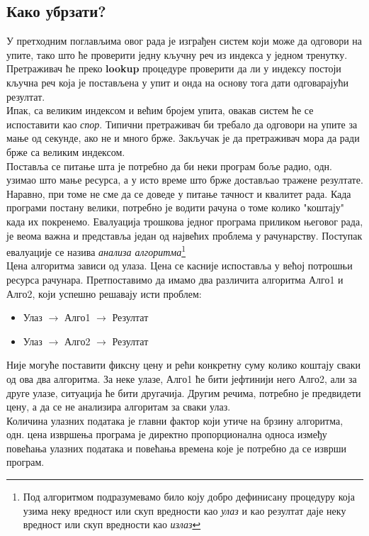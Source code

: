	\subsection{Како убрзати?}
	У претходним поглављима овог рада је изграђен систем који може да одговори на упите, тако што ће проверити једну кључну реч из индекса у једном тренутку. Претраживач ће преко \textbf{lookup} процедуре проверити да ли у индексу постоји кључна реч која је постављена у упит и онда на основу тога дати одговарајући резултат. \\
	Ипак, са великим индексом и већим бројем упита, овакав систем ће се испоставити као \emph{спор}. Типични претраживач би требало да одговори на упите за мање од секунде, ако не и много брже. Закључак је да претраживач мора да ради брже са великим индексом.\\
	Поставља се питање шта је потребно да би неки програм боље радио, одн. узимао што мање ресурса, а у исто време што брже достављао тражене резултате. Наравно, при томе не сме да се доведе у питање тачност и квалитет рада. Када програми постану велики, потребно је водити рачуна о томе колико "коштају" када их покренемо. Евалуација трошкова једног програма приликом његовог рада, је веома важна и представља један од највећих проблема у рачунарству. Поступак евалуације се назива \emph{анализа алгоритма}\footnote{Под алгоритмом подразумевамо било коју добро дефинисану процедуру која узима неку вредност или скуп вредности као \emph{улаз} и као резултат даје неку вредност или скуп вредности као \emph{излаз}\cite{cormen2001introduction}}\\
	Цена алгоритма зависи од улаза. Цена се касније испоставља у већој потрошњи ресурса рачунара. Претпоставимо да имамо два различита алгоритма Алго1 и Алго2, који успешно решавају исти проблем:
	\begin{itemize}
	\item Улаз $\longrightarrow$ Алго1 $\longrightarrow$ Резултат
	\item Улаз $\longrightarrow$ Алго2 $\longrightarrow$ Резултат
	\end{itemize}
	Није могуће поставити фиксну цену и рећи конкретну суму колико коштају сваки од ова два алгоритма. За неке улазе, Алго1 ће бити јефтинији него Алго2, али за друге улазе, ситуација ће бити другачија. Другим речима, потребно је предвидети цену, а да се не анализира алгоритам за сваки улаз. \\
	Количина улазних података је главни фактор који утиче на брзину алгоритма, одн. цена извршења програма је директно пропорционална односа између повећања улазних података и повећања времена које је потребно да се изврши програм. \\
